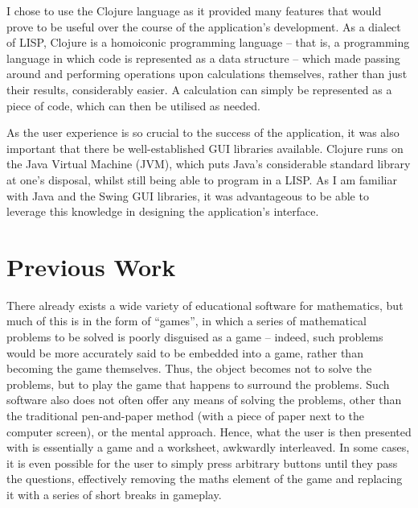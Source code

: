 \documentclass[12pt,twoside,notitlepage,xetex]{report}
\begin{document}
I chose to use the Clojure language as it provided many features that would
prove to be useful over the course of the application's development.  As a
dialect of LISP, Clojure is a homoiconic programming language -- that is, a
programming language in which code is represented as a data structure -- which
made passing around and performing operations upon calculations themselves,
rather than just their results, considerably easier.  A calculation can simply
be represented as a piece of code, which can then be utilised as needed.

As the user experience is so crucial to the success of the application, it was
also important that there be well-established GUI libraries available.  Clojure
runs on the Java Virtual Machine (JVM), which puts Java's considerable standard
library at one's disposal, whilst still being able to program in a LISP.  As I
am familiar with Java and the Swing GUI libraries, it was advantageous to be
able to leverage this knowledge in designing the application's interface.

\section{Previous Work}

There already exists a wide variety of educational software for mathematics, but
much of this is in the form of ``games'', in which a series of mathematical
problems to be solved is poorly disguised as a game -- indeed, such problems
would be more accurately said to be embedded into a game, rather than becoming
the game themselves.  Thus, the object becomes not to solve the problems, but to
play the game that happens to surround the problems.  Such software also does
not often offer any means of solving the problems, other than the traditional
pen-and-paper method (with a piece of paper next to the computer screen), or
the mental approach.  Hence, what the user is then presented with is essentially
a game and a worksheet, awkwardly interleaved.  In some cases, it is even
possible for the user to simply press arbitrary buttons until they pass the
questions, effectively removing the maths element of the game and replacing it
with a series of short breaks in gameplay. %
\end{document}
